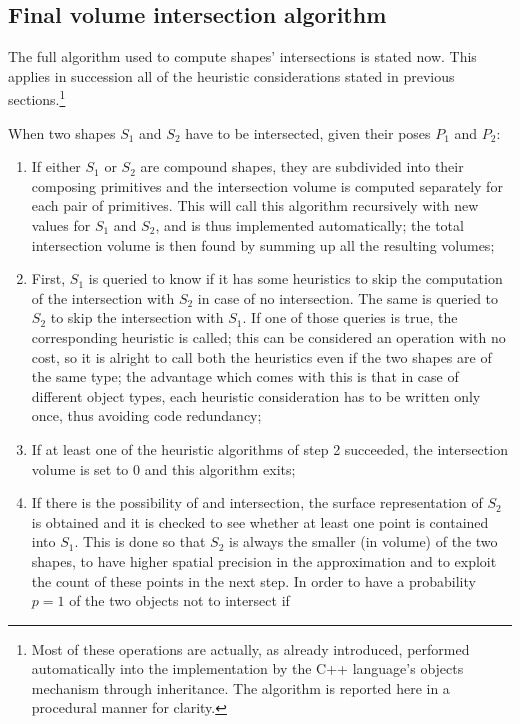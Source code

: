 \subsection{Final volume intersection algorithm}
The full algorithm used to compute shapes' intersections is stated
now. This applies in succession all of the heuristic considerations
stated in previous sections.\footnote{Most of these operations are
  actually, as already introduced, performed automatically into the
  implementation by the C++
  language's objects mechanism through inheritance. The algorithm is
  reported here in a procedural manner for clarity.}

When two shapes $S_1$ and $S_2$ have to be intersected, given their poses $P_1$ and $P_2$:
\begin{enumerate}
  \item{If either $S_1$ or $S_2$ are compound shapes, they are
    subdivided into their composing primitives and the intersection
    volume is computed separately for each pair of primitives. This
    will call this algorithm recursively with new values for $S_1$ and
    $S_2$, and is thus implemented automatically; the total
    intersection volume is then found by summing up all the resulting volumes;}
  \item{First, $S_1$ is queried to know if it has some heuristics to
    skip the computation of the intersection with $S_2$ in case of no
    intersection. The same is queried to $S_2$ to skip the
    intersection with $S_1$. If one of those queries is true, the
    corresponding heuristic is called; this can be considered an
    operation with no cost, so it is alright to call both the
    heuristics even if the two shapes are of the same type; the
    advantage which comes with this is that in case of different
    object types, each heuristic consideration has to be written only
    once, thus avoiding code redundancy;}
  \item{If at least one of the heuristic algorithms of step 2
    succeeded, the intersection volume is set to $0$ and this algorithm
    exits;}
  \item{If there is the possibility of and intersection, the surface
    representation of $S_2$ is obtained and it is checked to see
    whether at least one point is contained into $S_1$. This is done
    so that $S_2$ is always the smaller (in volume) of the two shapes,
    to have higher spatial precision in the approximation and to
    exploit the count of these points in the next step.
    In order to
    have a probability $p=1$ of the two objects not to intersect if
}
\end{enumerate}
